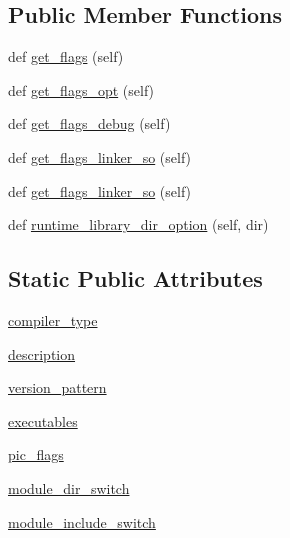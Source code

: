 \subsection*{Public Member Functions}
\begin{DoxyCompactItemize}
\item 
def \hyperlink{classnumpy_1_1distutils_1_1fcompiler_1_1pg_1_1PGroupFCompiler_a1dffcbbf4aab0bb54850178810d9041c}{get\+\_\+flags} (self)
\item 
def \hyperlink{classnumpy_1_1distutils_1_1fcompiler_1_1pg_1_1PGroupFCompiler_a1f9779e15fb704da0412f1b844d77b23}{get\+\_\+flags\+\_\+opt} (self)
\item 
def \hyperlink{classnumpy_1_1distutils_1_1fcompiler_1_1pg_1_1PGroupFCompiler_a0246e8f14696fed4b322d039022b3846}{get\+\_\+flags\+\_\+debug} (self)
\item 
def \hyperlink{classnumpy_1_1distutils_1_1fcompiler_1_1pg_1_1PGroupFCompiler_aace7af798edaff68b0558a00234b8386}{get\+\_\+flags\+\_\+linker\+\_\+so} (self)
\item 
def \hyperlink{classnumpy_1_1distutils_1_1fcompiler_1_1pg_1_1PGroupFCompiler_aace7af798edaff68b0558a00234b8386}{get\+\_\+flags\+\_\+linker\+\_\+so} (self)
\item 
def \hyperlink{classnumpy_1_1distutils_1_1fcompiler_1_1pg_1_1PGroupFCompiler_a020d21aba04f7b711bf7ca79fb5d1098}{runtime\+\_\+library\+\_\+dir\+\_\+option} (self, dir)
\end{DoxyCompactItemize}
\subsection*{Static Public Attributes}
\begin{DoxyCompactItemize}
\item 
\hyperlink{classnumpy_1_1distutils_1_1fcompiler_1_1pg_1_1PGroupFCompiler_a7ffb96952eeec1c5fb8628566c07cc9d}{compiler\+\_\+type}
\item 
\hyperlink{classnumpy_1_1distutils_1_1fcompiler_1_1pg_1_1PGroupFCompiler_a16f991021429e2b26bd3740f92c3fd96}{description}
\item 
\hyperlink{classnumpy_1_1distutils_1_1fcompiler_1_1pg_1_1PGroupFCompiler_a5a3da13a55802ad157f3e943e27a67d9}{version\+\_\+pattern}
\item 
\hyperlink{classnumpy_1_1distutils_1_1fcompiler_1_1pg_1_1PGroupFCompiler_a471849b3f33ce230e0bb02282efa6c74}{executables}
\item 
\hyperlink{classnumpy_1_1distutils_1_1fcompiler_1_1pg_1_1PGroupFCompiler_ae32e4e9fed822c31d62ef2a6f8ca5ec0}{pic\+\_\+flags}
\item 
\hyperlink{classnumpy_1_1distutils_1_1fcompiler_1_1pg_1_1PGroupFCompiler_a7c44a7fac52583d8fa23d40b52cb06f0}{module\+\_\+dir\+\_\+switch}
\item 
\hyperlink{classnumpy_1_1distutils_1_1fcompiler_1_1pg_1_1PGroupFCompiler_a2f0fa4b04c0ee58f266f43d38ba2d5d5}{module\+\_\+include\+\_\+switch}
\end{DoxyCompactItemize}


